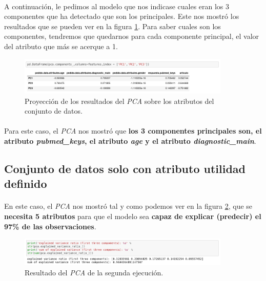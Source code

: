 \paragraph{}
A continuación, le pedimos al modelo que nos indicase cuales eran los 3 componentes que ha detectado que son los principales. Este nos mostró los resultados que se pueden ver en la figura \ref{pcaOneAtributos}. Para saber cuales son los componentes, tendremos que quedarnos para cada componente principal, el valor del atributo que más se acerque a 1.

\begin{figure}[!htb]
  \centering
    \includegraphics[width=0.9\textwidth]{images/resultados_procesado_de_datos_pca1_atributos.png}
    \caption{Proyección de los resultados del \textit{PCA} sobre los atributos del conjunto de datos.}
  \label{pcaOneAtributos}
\end{figure}

\paragraph{}
Para este caso, el \textit{PCA} nos mostró que \textbf{los 3 componentes principales son, el atributo \textit{pubmed\_keys}, el atributo \textit{age} y el atributo \textit{diagnostic\_main}}.

\subsection{Conjunto de datos solo con atributo utilidad definido}
\label{result:pca_case2}
\paragraph{}
En este caso, el \textit{PCA} nos mostró tal y como podemos ver en la figura \ref{pcaTwoResult}, que se \textbf{necesita 5 atributos} para que el modelo sea \textbf{capaz de explicar (predecir) el 97\% de las observaciones}.

\begin{figure}[!htb]
  \centering
    \includegraphics[width=0.9\textwidth]{images/resultados_procesado_de_datos_pca2_result.png}
    \caption{Resultado del \textit{PCA} de la segunda ejecución.}
  \label{pcaTwoResult}
\end{figure}

